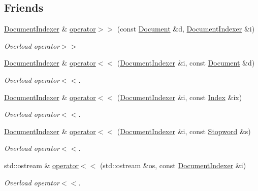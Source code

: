 \subsection*{Friends}
\begin{DoxyCompactItemize}
\item 
\hyperlink{class_document_indexer}{Document\+Indexer} \& \hyperlink{class_document_indexer_adf57f424618ad5604e84eac633f977e9}{operator$>$$>$} (const \hyperlink{class_document}{Document} \&d, \hyperlink{class_document_indexer}{Document\+Indexer} \&i)
\begin{DoxyCompactList}\small\item\em Overload operator$>$$>$ \end{DoxyCompactList}\item 
\hyperlink{class_document_indexer}{Document\+Indexer} \& \hyperlink{class_document_indexer_a6c2e084b73080867237d1637bc040d66}{operator$<$$<$} (\hyperlink{class_document_indexer}{Document\+Indexer} \&i, const \hyperlink{class_document}{Document} \&d)
\begin{DoxyCompactList}\small\item\em Overload operator$<$$<$. \end{DoxyCompactList}\item 
\hyperlink{class_document_indexer}{Document\+Indexer} \& \hyperlink{class_document_indexer_a82199a005a825421b7db05a3c2547180}{operator$<$$<$} (\hyperlink{class_document_indexer}{Document\+Indexer} \&i, const \hyperlink{class_index}{Index} \&ix)
\begin{DoxyCompactList}\small\item\em Overload operator$<$$<$. \end{DoxyCompactList}\item 
\hyperlink{class_document_indexer}{Document\+Indexer} \& \hyperlink{class_document_indexer_aadb77ccf09197d3adf55667f29672346}{operator$<$$<$} (\hyperlink{class_document_indexer}{Document\+Indexer} \&i, const \hyperlink{class_stopword}{Stopword} \&s)
\begin{DoxyCompactList}\small\item\em Overload operator$<$$<$. \end{DoxyCompactList}\item 
std\+::ostream \& \hyperlink{class_document_indexer_a09373f25959741150437b95f15ae11e2}{operator$<$$<$} (std\+::ostream \&os, const \hyperlink{class_document_indexer}{Document\+Indexer} \&i)
\begin{DoxyCompactList}\small\item\em Overload operator$<$$<$. \end{DoxyCompactList}\end{DoxyCompactItemize}
